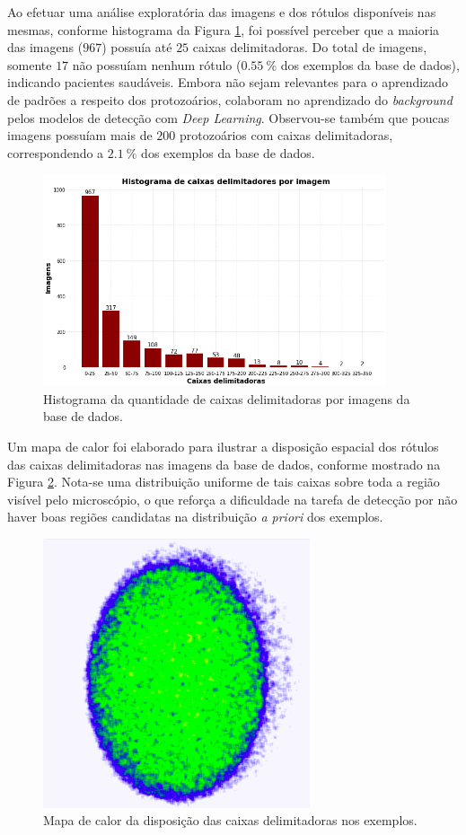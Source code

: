 Ao efetuar uma análise exploratória das imagens e dos rótulos disponíveis nas mesmas, conforme histograma da Figura \ref{fig:histogram}, foi possível perceber que a maioria das imagens ($967$) possuía até $25$ caixas delimitadoras. Do total de imagens,  somente $17$ não possuíam nenhum rótulo ($\SI{0.55}{\percent}$ dos exemplos da base de dados), indicando pacientes saudáveis. Embora não sejam relevantes para o aprendizado de padrões a respeito dos protozoários, colaboram no aprendizado do \emph{background} pelos modelos de detecção com \emph{Deep Learning}. Observou-se também que poucas imagens possuíam mais de $200$ protozoários com caixas delimitadoras, correspondendo a $\SI{2.1}{\percent}$ dos exemplos da base de dados.

 \begin{figure}[ht]
    \centering
    \includegraphics[width=0.9\textwidth]{img/histogram.png}\hfill
    \caption{Histograma da quantidade de caixas delimitadoras por imagens da base de dados.}
    \label{fig:histogram}
\end{figure}

Um mapa de calor foi elaborado para ilustrar a disposição espacial dos rótulos das caixas delimitadoras nas imagens da base de dados, conforme mostrado na Figura \ref{fig:heat-map}. Nota-se uma distribuição uniforme de tais caixas sobre toda a região visível pelo microscópio, o que reforça a dificuldade na tarefa de detecção por não haver boas regiões candidatas na distribuição \emph{a priori} dos exemplos.

\begin{figure}[H]
    \centering
    \includegraphics[width=0.7\textwidth,height=0.525\textwidth]{img/heat-map.png}\hfill
    \caption{Mapa de calor da disposição das caixas delimitadoras nos exemplos.}
    \label{fig:heat-map}
\end{figure}

